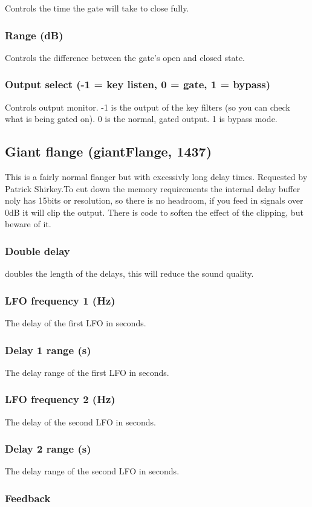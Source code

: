 \documentclass[11pt]{article}
\begin{document}
Controls the time the gate will take to close fully.\subsubsection*{Range (dB)}
Controls the difference between the gate's open and closed state.\subsubsection*{Output select (-1 = key listen, 0 = gate, 1 = bypass)}
Controls output monitor. -1 is the output of the key filters (so you can check what is being gated on). 0 is the normal, gated output. 1 is bypass mode.\subsection{Giant flange (giantFlange, 1437)\label{giantFlange}\label{id1437}}
This is a fairly normal flanger but with excessivly long delay times.
Requested by Patrick Shirkey.To cut down the memory requirements the internal delay buffer noly has
15bits or resolution, so there is no headroom, if you feed in signals over 0dB
it will clip the output. There is code to soften the effect of the clipping,
but beware of it.\subsubsection*{Double delay}
doubles the length of the delays, this will reduce the sound quality.\subsubsection*{LFO frequency 1 (Hz)}
The delay of the first LFO in seconds.\subsubsection*{Delay 1 range (s)}
The delay range of the first LFO in seconds.\subsubsection*{LFO frequency 2 (Hz)}
The delay of the second LFO in seconds.\subsubsection*{Delay 2 range (s)}
The delay range of the second LFO in seconds.\subsubsection*{Feedback}
\end{document}
